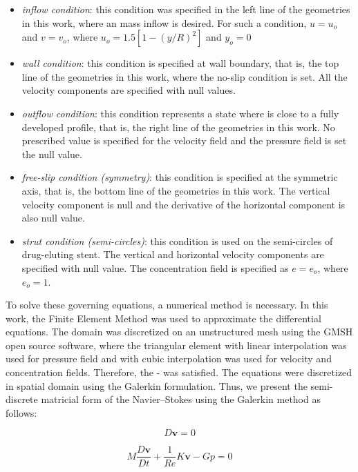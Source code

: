 \documentclass[10pt,fleqn,a4paper,twoside]{article}
\begin{document}
\begin{itemize}
\item {\textit{inflow condition}:
 this condition was specified in the left line of the geometries in
 this work, where an mass inflow is desired.
 For such a condition, $u = u_{o}$
 and $v = v_{o}$, where $u_{o}=1.5[1-(y/R)^{2}]$ and $y_{o}=0$}
 \item {\textit{wall condition}:
 this condition is specified at wall boundary, that is,
 the top line of the geometries in this work, where
 the no-slip condition is set.
 All the velocity components are specified with
 null values.}
 \item {\textit{outflow condition}:
 this condition represents a state where is close to a
 fully developed profile, that is, the right line of the
 geometries in this work.
 No prescribed value is specified for the velocity field
 and the pressure field is set the null value.}
 \item {\textit{free-slip condition (symmetry)}:
 this condition is specified at the symmetric axis,
 that is, the bottom line of the geometries in this work.
 The vertical velocity component is null and the derivative of
 the horizontal component is also null value.}
 \item {\textit{strut condition (semi-circles)}:
 this condition is used on the semi-circles of drug-eluting stent.
 The vertical and horizontal
 velocity components are specified with null value.
 The concentration field is specified as $e=e_{o}$, where $e_{o}=1$.}
\end{itemize}


To solve these governing equations, a numerical method is necessary. In this work, the
Finite Element Method was used to approximate the differential equations.
The domain was discretized on an unstructured mesh using the
GMSH open source software, 
where the triangular element with linear interpolation
was used for pressure field and with cubic interpolation
was used for velocity and concentration fields.
Therefore, the \citeauthor{babuska1971}-\citeauthor{brezzi1974} 
was
satisfied. 
The equations were discretized in spatial domain using the Galerkin formulation.
Thus, we present the semi-discrete
matricial form of the Navier--Stokes using the Galerkin method
as follows:


\vspace{-0.4cm}
\begin{equation}
 D\textbf{v} = 0
\end{equation}

\vspace{-0.65cm}
\begin{equation}
 M \frac{D \textbf{v}}{Dt} 
 + \frac{1}{\textit{Re}} K \textbf{v}
 - Gp
 = 0 \label{vorticity matrix}
\end{equation}
\end{document}
